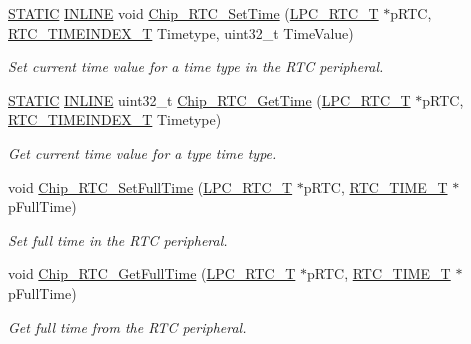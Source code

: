\begin{DoxyCompactItemize}
\hyperlink{group___l_p_c___types___public___macros_ga10b2d890d871e1489bb02b7e70d9bdfb}{S\+T\+A\+T\+IC} \hyperlink{spifi__18xx__43xx_8h_a2eb6f9e0395b47b8d5e3eeae4fe0c116}{I\+N\+L\+I\+NE} void \hyperlink{group___r_t_c__18_x_x__43_x_x_ga8104b580aeb00a3d5a9e325b3162b1bb}{Chip\+\_\+\+R\+T\+C\+\_\+\+Set\+Time} (\hyperlink{struct_l_p_c___r_t_c___t}{L\+P\+C\+\_\+\+R\+T\+C\+\_\+T} $\ast$p\+R\+TC, \hyperlink{group___r_t_c__18_x_x__43_x_x_ga8144898fe628404d396db06dc8aac0e0}{R\+T\+C\+\_\+\+T\+I\+M\+E\+I\+N\+D\+E\+X\+\_\+T} Timetype, uint32\+\_\+t Time\+Value)
\begin{DoxyCompactList}\small\item\em Set current time value for a time type in the R\+TC peripheral. \end{DoxyCompactList}\item 
\hyperlink{group___l_p_c___types___public___macros_ga10b2d890d871e1489bb02b7e70d9bdfb}{S\+T\+A\+T\+IC} \hyperlink{spifi__18xx__43xx_8h_a2eb6f9e0395b47b8d5e3eeae4fe0c116}{I\+N\+L\+I\+NE} uint32\+\_\+t \hyperlink{group___r_t_c__18_x_x__43_x_x_ga661c73c8fce7243b30a207ad7cbee59b}{Chip\+\_\+\+R\+T\+C\+\_\+\+Get\+Time} (\hyperlink{struct_l_p_c___r_t_c___t}{L\+P\+C\+\_\+\+R\+T\+C\+\_\+T} $\ast$p\+R\+TC, \hyperlink{group___r_t_c__18_x_x__43_x_x_ga8144898fe628404d396db06dc8aac0e0}{R\+T\+C\+\_\+\+T\+I\+M\+E\+I\+N\+D\+E\+X\+\_\+T} Timetype)
\begin{DoxyCompactList}\small\item\em Get current time value for a type time type. \end{DoxyCompactList}\item 
void \hyperlink{group___r_t_c__18_x_x__43_x_x_ga501471295a030ca2dc2872577367073e}{Chip\+\_\+\+R\+T\+C\+\_\+\+Set\+Full\+Time} (\hyperlink{struct_l_p_c___r_t_c___t}{L\+P\+C\+\_\+\+R\+T\+C\+\_\+T} $\ast$p\+R\+TC, \hyperlink{struct_r_t_c___t_i_m_e___t}{R\+T\+C\+\_\+\+T\+I\+M\+E\+\_\+T} $\ast$p\+Full\+Time)
\begin{DoxyCompactList}\small\item\em Set full time in the R\+TC peripheral. \end{DoxyCompactList}\item 
void \hyperlink{group___r_t_c__18_x_x__43_x_x_gab03d971e0b77ba907f414cdc00acce3b}{Chip\+\_\+\+R\+T\+C\+\_\+\+Get\+Full\+Time} (\hyperlink{struct_l_p_c___r_t_c___t}{L\+P\+C\+\_\+\+R\+T\+C\+\_\+T} $\ast$p\+R\+TC, \hyperlink{struct_r_t_c___t_i_m_e___t}{R\+T\+C\+\_\+\+T\+I\+M\+E\+\_\+T} $\ast$p\+Full\+Time)
\begin{DoxyCompactList}\small\item\em Get full time from the R\+TC peripheral. \end{DoxyCompactList}\item 

\end{DoxyCompactItemize}
